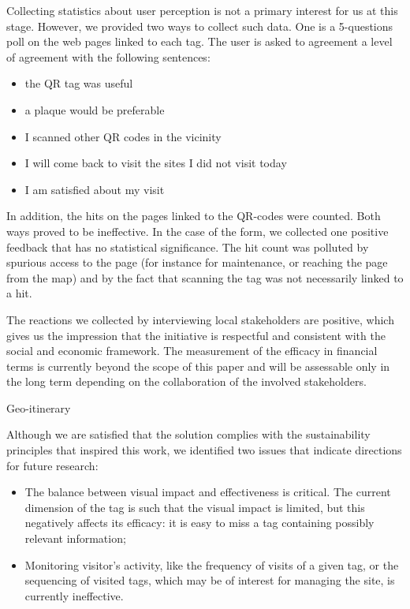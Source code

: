 \documentclass[sustainability,article,submit,pdftex,moreauthors]{Definitions/mdpi}
\begin{document}
Collecting statistics about user perception is not a primary interest for us at this stage. However, we provided two ways to collect such data. One is a 5-questions poll on the web pages linked to each tag. The user is asked to agreement a level of agreement with the following sentences:
\begin {itemize}
\item the QR tag was useful
\item a plaque would be preferable
\item I scanned other QR codes in the vicinity
\item I will come back to visit the sites I did not visit today
\item I am satisfied about my visit
\end{itemize}
In addition, the hits on the pages linked to the QR-codes were counted. Both ways proved to be ineffective. In the case of the form, we collected one positive feedback that has no statistical significance. The hit count was polluted by spurious access to the page (for instance for maintenance, or reaching the page from the map) and by the fact that scanning the tag was not necessarily linked to a hit.

The reactions we collected by interviewing local stakeholders are positive, which gives us the impression that the initiative is respectful and consistent with the social and economic framework. The measurement of the efficacy in financial terms is currently beyond the scope of this paper and will be assessable only in the long term depending on the collaboration of the involved stakeholders.

Geo-itinerary

Although we are satisfied that the solution complies with the sustainability principles that inspired this work, we identified two issues that indicate directions for future research:

\begin{itemize}
    \item The balance between visual impact and effectiveness is critical. The current dimension of the tag is such that the visual impact is limited, but this negatively affects its efficacy: it is easy to miss a tag containing possibly relevant information;
    \item Monitoring visitor's activity, like the frequency of visits of a given tag, or the sequencing of visited tags, which may be of interest for managing the site, is currently ineffective.
\end{itemize}
\end{document}
